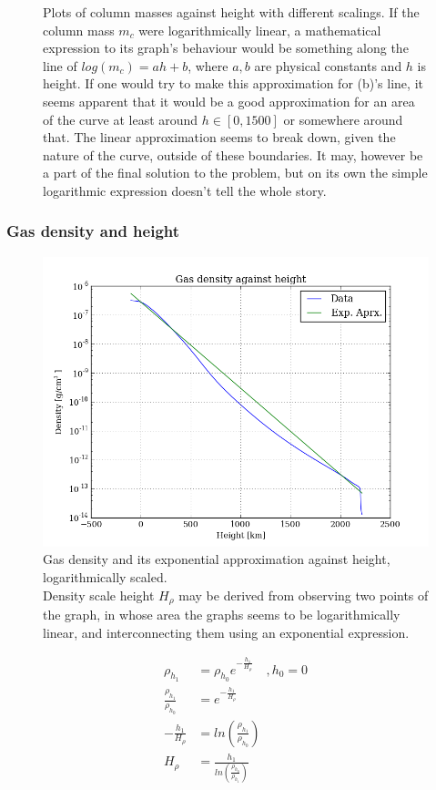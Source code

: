 \documentclass[11pt,a4paper,notitlepage]{article}
\begin{document}
\begin{figure}[H]
\caption{Plots of column masses against height with different scalings. If the column mass $m_c$ were logarithmically linear, a mathematical expression to its graph's behaviour would be something along the line of $log(m_c) = a h + b$, where $a, b$ are physical constants and $h$ is height. If one would try to make this approximation for (b)'s line, it seems apparent that it would be a good approximation for an area of the curve at least around $h \in [0, 1500]$ or somewhere around that. The linear approximation seems to break down, given the nature of the curve, outside of these boundaries. It may, however be a part of the final solution to the problem, but on its own the simple logarithmic expression doesn't tell the whole story.}
\end{figure}

\subsubsection{Gas density and height}
\begin{figure}[H]
\center

	\includegraphics[scale=0.42]{../figs/gasdens_vs_h.png}
	\caption{Gas density and its exponential approximation against height, logarithmically scaled.\\ Density scale height $H_\rho$ may be derived from observing two points of the graph, in whose area the graphs seems to be logarithmically linear, and interconnecting them using an exponential expression.}
\end{figure}
\begin{align}
\rho_{h_1} &= \rho_{h_0} e^{ -\frac{h_1}{H_\rho} } \quad , h_0 = 0 \nonumber \\ 
\frac{\rho_{h_1}}{\rho_{h_0}} &= e^{ -\frac{h_1}{H_\rho} } \nonumber\\ 
- \frac{h_1}{H_\rho} &= ln\left( \frac{\rho_{h_1}}{\rho_{h_0}} \right) \nonumber \\
H_\rho &= \frac{h_1}{ ln\left( \frac{\rho_{h_0}}{\rho_{h_1}} \right) }
\end{align}
\end{document}
